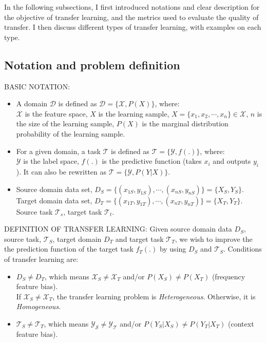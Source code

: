 \par In the following subsections, I first introduced notations and clear description for the objective of transfer learning, and the metrics used to evaluate the quality of transfer. I then discuss different types of transfer learning, with examples on each type.

\subsection{Notation and problem definition}
\par BASIC NOTATION:
\begin{itemize}[noitemsep]
    \item A domain $\mathcal{D}$ is defined as $\mathcal{D} = \{\mathcal{X}, P(X)\}$, where:\\
    $\mathcal{X}$ is the feature space, $X$ is the learning sample, $X = \{x_1,x_2,\cdots,x_n\} \in \mathcal{X}$, $n$ is the size of the learning sample, $P(X)$ is the marginal distribution probability of the learning sample.

    \item For a given domain, a task $\mathcal{T}$ is defined as $\mathcal{T} = \{\mathcal{Y}, f(.)\}$, where:\\
    $\mathcal{Y}$ is the label space, $f(.)$ is the predictive function (takes $x_i$ and outputs $y_i$). It can also be rewritten as $\mathcal{T} = \{\mathcal{Y}, P(Y|X)\}$.

    \item Source domain data set, $D_S = \{(x_{1S},y_{1S}),\cdots,(x_{nS},y_{nS})\} = \{X_S,Y_S\}$.\\ Target domain data set, $D_T = \{(x_{1T},y_{1T}),\cdots,(x_{nT},y_{nT})\}= \{X_T,Y_T\}$.\\
    Source task $\mathcal{T}_s$, target task $\mathcal{T}_t$.
\end{itemize}


\par DEFINITION OF TRANSFER LEARNING: Given source domain data $D_S$, source task, $\mathcal{T}_S$,  target domain $D_T$ and target task $\mathcal{T}_T$, we wish to improve the the prediction function of the target task $f_T(.)$ by using $D_S$ and $\mathcal{T}_S$. Conditions of transfer learning are:

\begin{itemize}[noitemsep]
    \item $D_S \neq D_T$, which means $\mathcal{X}_S \neq \mathcal{X}_T$ and/or $P(X_S) \neq P(X_T)$ (frequency feature bias).\\
    If $\mathcal{X}_S \neq \mathcal{X}_T$, the transfer learning problem is \textit{Heterogeneous}. Otherwise, it is \textit{Homogeneous}.

    \item $\mathcal{T}_S \neq \mathcal{T}_T$, which means $\mathcal{Y_S} \neq \mathcal{Y_T}$ and/or $P(Y_S|X_S) \neq P(Y_T|X_T)$ (context feature bias).
\end{itemize}

